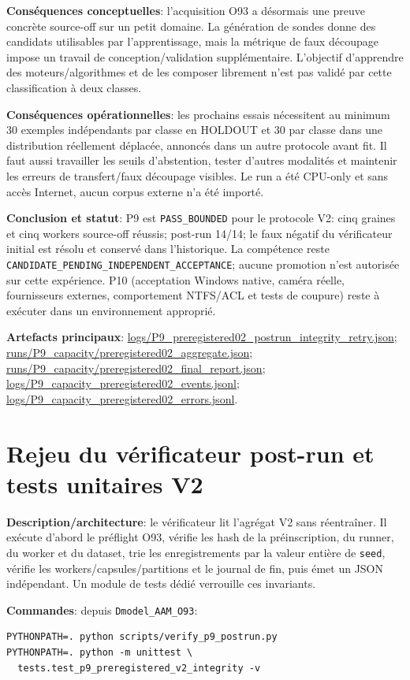 \documentclass[11pt,a4paper,oneside]{report}
\begin{document}
\textbf{Conséquences conceptuelles}: l'acquisition O93 a désormais une preuve concrète source-off sur un petit domaine. La génération de sondes donne des candidats utilisables par l'apprentissage, mais la métrique de faux découpage impose un travail de conception/validation supplémentaire. L'objectif d'apprendre des moteurs/algorithmes et de les composer librement n'est pas validé par cette classification à deux classes.

\textbf{Conséquences opérationnelles}: les prochains essais nécessitent au minimum 30 exemples indépendants par classe en HOLDOUT et 30 par classe dans une distribution réellement déplacée, annoncés dans un autre protocole avant fit. Il faut aussi travailler les seuils d'abstention, tester d'autres modalités et maintenir les erreurs de transfert/faux découpage visibles. Le run a été CPU-only et sans accès Internet, aucun corpus externe n'a été importé.

\textbf{Conclusion et statut}: P9 est \texttt{PASS\_BOUNDED} pour le protocole V2: cinq graines et cinq workers source-off réussis; post-run 14/14; le faux négatif du vérificateur initial est résolu et conservé dans l'historique. La compétence reste \texttt{CANDIDATE\_\allowbreak PENDING\_\allowbreak INDEPENDENT\_\allowbreak ACCEPTANCE}; aucune promotion n'est autorisée sur cette expérience. P10 (acceptation Windows native, caméra réelle, fournisseurs externes, comportement NTFS/ACL et tests de coupure) reste à exécuter dans un environnement approprié.

\textbf{Artefacts principaux}: \url{logs/P9_preregistered02_postrun_integrity_retry.json}; \url{runs/P9_capacity/preregistered02_aggregate.json}; \url{runs/P9_capacity/preregistered02_final_report.json}; \url{logs/P9_capacity_preregistered02_events.jsonl}; \url{logs/P9_capacity_preregistered02_errors.jsonl}.


\section{Rejeu du vérificateur post-run et tests unitaires V2}
\textbf{Description/architecture}: le vérificateur lit l'agrégat V2 sans réentraîner. Il exécute d'abord le préflight O93, vérifie les hash de la préinscription, du runner, du worker et du dataset, trie les enregistrements par la valeur entière de \texttt{seed}, vérifie les workers/capsules/partitions et le journal de fin, puis émet un JSON indépendant. Un module de tests dédié verrouille ces invariants.

\textbf{Commandes}: depuis \texttt{Dmodel\_AAM\_O93}:
\begin{lstlisting}[basicstyle=\ttfamily\small,breaklines=true]
PYTHONPATH=. python scripts/verify_p9_postrun.py
PYTHONPATH=. python -m unittest \
  tests.test_p9_preregistered_v2_integrity -v
\end{lstlisting}
\end{document}
